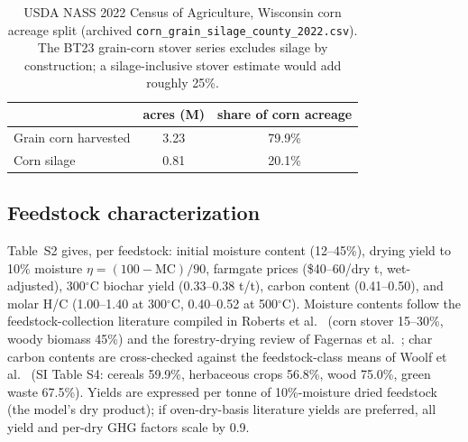 \begin{table}[htbp]
\centering
\caption{\small USDA NASS 2022 Census of Agriculture, Wisconsin corn acreage split
(archived \texttt{corn\_grain\_silage\_county\_2022.csv}). The BT23 grain-corn
stover series excludes silage by construction; a silage-inclusive stover
estimate would add roughly 25\%.}
\label{tab:s1}
\begin{tabular}{lcc}
\toprule
 & acres (M) & share of corn acreage\\
\midrule
Grain corn harvested & 3.23 & 79.9\%\\
Corn silage & 0.81 & 20.1\%\\
\bottomrule
\end{tabular}
\end{table}

\subsection{Feedstock characterization}

Table~S2 gives, per feedstock: initial moisture content (12--45\%), drying
yield to 10\% moisture $\eta=(100-\mathrm{MC})/90$, farmgate prices (\$40--60/dry
t, wet-adjusted), 300$^\circ$C biochar yield (0.33--0.38 t/t), carbon content
(0.41--0.50), and molar H/C (1.00--1.40 at 300$^\circ$C, 0.40--0.52 at
500$^\circ$C). Moisture contents follow the
feedstock-collection literature compiled in Roberts et al.\ \cite{roberts2010}
(corn stover 15--30\%, woody biomass 45\%) and the forestry-drying review of
Fagernas et al.\ \cite{fagernas2010}; char carbon contents are cross-checked
against the feedstock-class means of Woolf et al.\ \cite{woolf2010} (SI Table
S4: cereals 59.9\%, herbaceous crops 56.8\%, wood 75.0\%, green waste 67.5\%).
Yields are expressed per tonne of 10\%-moisture dried
feedstock (the model's dry product); if oven-dry-basis literature yields are
preferred, all yield and per-dry GHG factors scale by 0.9.


